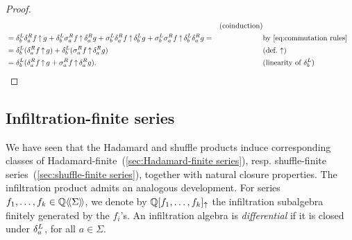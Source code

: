 \begin{proof}
\begin{align*}
                &&\text{(coinduction)} \\
            &=  \deriveleft b \deriveright a f \infiltration g + \deriveleft b \sigma^R_a f \infiltration \deriveright a g
                + \sigma^L_b \deriveright a f \infiltration \deriveleft b g + \sigma^L_b \sigma^R_a  f \infiltration \deriveleft b \deriveright a g =
                &&\text{by~\cref{eq:commutation rules}} \\
            &= \deriveleft b (\deriveright a f \infiltration g)
                + \deriveleft b (\sigma^R_a f \infiltration \deriveright a g)
                &&\text{(def.~$\infiltration$)} \\
            &= \deriveleft b (\deriveright a f \infiltration g + \sigma^R_a f \infiltration \deriveright a g).
                &&\text{(linearity of $\deriveleft b$)} \qedhere
    \end{align*}
\end{proof}

\subsection{Infiltration-finite series}
\label{sec:infiltration-finite series}

We have seen that the Hadamard and shuffle products induce corresponding classes of
Hadamard-finite~(\cref{sec:Hadamard-finite series}), resp.
shuffle-finite series~(\cref{sec:shuffle-finite series}),
together with natural closure properties.
%
The infiltration product admits an analogous development.
%
For series $f_1, \dots, f_k \in \mathbb Q\langle\!\langle\Sigma\rangle\!\rangle$,
we denote by $\mathbb Q[f_1, \dots, f_k]_{\operatorname{\uparrow}}$
the infiltration subalgebra finitely generated by the $f_i$'s.
%
%
An infiltration algebra is \emph{differential}
if it is closed under $\delta^L_{a}$, for all $a \in \Sigma$.


